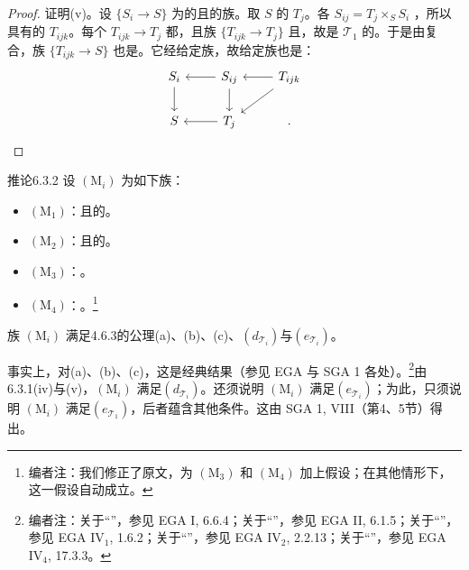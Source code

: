 \begin{proof}
证明(v)。设 $\{S_i\to S\}$ 为的且的族。取 $S$ 的 $T_j$。各 $S_{ij}=T_j\times_S S_i$ ，所以具有的 $T_{ijk}$。每个 $T_{ijk}\to T_j$ 都，且族 $\{T_{ijk}\to T_j\}$ 且，故是 $\mathcal T_1$ 的。于是由复合，族 $\{T_{ijk}\to S\}$ 也是。它经给定族，故给定族也是：
\[
\begin{tikzcd}
S_i\arrow[d]&S_{ij}\arrow[l]\arrow[d]&T_{ijk}\arrow[l]\arrow[dl]\\
S&T_j\arrow[l]&.
\end{tikzcd}
\]
\end{proof}
\begin{SGAresult}{推论}{6.3.2}
设 $(\mathrm M_i)$ 为如下族：
\begin{itemize}
\item $(\mathrm M_1)$：且的。
\item $(\mathrm M_2)$：且的。
\item $(\mathrm M_3)$：。
\item $(\mathrm M_4)$：。\footnote{编者注：我们修正了原文，为 $(\mathrm M_3)$ 和 $(\mathrm M_4)$ 加上假设；在其他情形下，这一假设自动成立。}
\end{itemize}
族 $(\mathrm M_i)$ 满足4.6.3的公理(a)、(b)、(c)、$(d_{\mathcal T_i})$与$(e_{\mathcal T_i})$。
\end{SGAresult}
事实上，对(a)、(b)、(c)，这是经典结果（参见 EGA 与 SGA 1 各处）。\footnote{编者注：关于“”，参见 EGA I, 6.6.4；关于“”，参见 EGA II, 6.1.5；关于“”，参见 EGA IV$_1$, 1.6.2；关于“”，参见 EGA IV$_2$, 2.2.13；关于“”，参见 EGA IV$_4$, 17.3.3。}由6.3.1(iv)与(v)，$(\mathrm M_i)$ 满足$(d_{\mathcal T_i})$。还须说明 $(\mathrm M_i)$ 满足$(e_{\mathcal T_i})$；为此，只须说明 $(\mathrm M_i)$ 满足$(e_{\mathcal T_1})$，后者蕴含其他条件。这由 SGA 1, VIII（第4、5节）得出。
